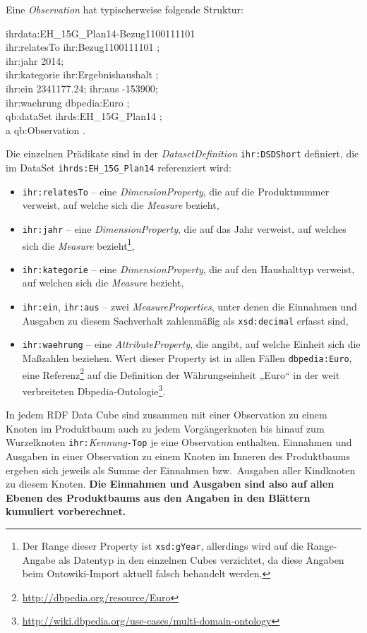 \documentclass[a4paper,11pt,twoside]{article}
\begin{document}
Eine \emph{Observation} hat typischerweise folgende Struktur:
\begin{code}
ihrdata:EH\_15G\_Plan14-Bezug1100111101\+\\
    ihr:relatesTo ihr:Bezug1100111101 ;\\
    ihr:jahr {\dq}2014{\dq};\\
    ihr:kategorie ihr:Ergebnishaushalt ;\\
    ihr:ein {\dq}2341177.24{\dq}; ihr:aus {\dq}-153900{\dq};\\
    ihr:waehrung dbpedia:Euro ;\\
    qb:dataSet ihrds:EH\_15G\_Plan14 ;\\
    a qb:Observation .
\end{code}
Die einzelnen Prädikate sind in der \emph{DatasetDefinition}
\texttt{ihr:DSDShort} definiert, die im DataSet \texttt{ihrds:EH\_15G\_Plan14}
referenziert wird:
\begin{itemize}\itemsep0pt
\item \texttt{ihr:relatesTo} -- eine \emph{DimensionProperty}, die auf die
  Produktnummer verweist, auf welche sich die \emph{Measure} bezieht,
\item \texttt{ihr:jahr} -- eine \emph{DimensionProperty}, die auf das Jahr
  verweist, auf welches sich die \emph{Measure} bezieht\footnote{Der Range
    dieser Property ist \texttt{xsd:gYear}, allerdings wird auf die
    Range-Angabe als Datentyp in den einzelnen Cubes verzichtet, da diese
    Angaben beim Ontowiki-Import aktuell falsch behandelt werden.},
\item \texttt{ihr:kategorie}  -- eine \emph{DimensionProperty}, die auf den
  Haushalttyp verweist, auf welchen sich die \emph{Measure} bezieht,
\item \texttt{ihr:ein}, \texttt{ihr:aus} -- zwei \emph{MeasureProperties},
  unter denen die Einnahmen und Ausgaben zu diesem Sachverhalt zahlenmäßig als
  \texttt{xsd:decimal} erfasst sind, 
\item \texttt{ihr:waehrung} -- eine \emph{AttributeProperty}, die angibt, auf
  welche Einheit sich die Maßzahlen beziehen.  Wert dieser Property ist in
  allen Fällen \texttt{dbpedia:Euro}, eine
  Referenz\footnote{\url{http://dbpedia.org/resource/Euro}} auf die Definition
  der Währungseinheit „Euro“ in der weit verbreiteten
  Dbpedia-Ontologie\footnote{\url{http://wiki.dbpedia.org/use-cases/multi-domain-ontology}}.
\end{itemize}
In jedem RDF Data Cube sind zusammen mit einer Observation zu einem Knoten im
Produktbaum auch zu jedem Vorgängerknoten bis hinauf zum Wurzelknoten
\texttt{ihr:}\emph{Kennung}\texttt{-Top} je eine Observation enthalten.
Einnahmen und Ausgaben in einer Observation zu einem Knoten im Inneren des
Produktbaums ergeben sich jeweils als Summe der Einnahmen bzw.\ Ausgaben aller
Kindknoten zu diesem Knoten.  \textbf{Die Einnahmen und Ausgaben sind also auf
  allen Ebenen des Produktbaums aus den Angaben in den Blättern kumuliert
  vorberechnet.}
\end{document}
